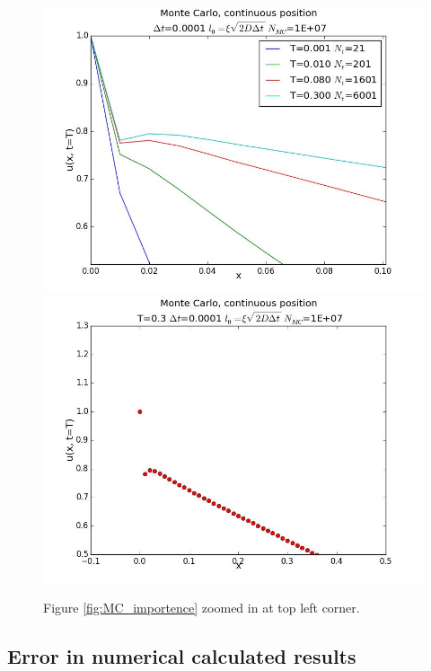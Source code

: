 \documentclass[12pt]{article}
\begin{document}
\begin{flushleft}
\begin{figure}[!h]
  \begin{minipage}{\linewidth}
    \centering
    {\includegraphics[scale=0.27]{MC_importance_zoom}}
     {\includegraphics[scale=0.27]{hist}}
    \caption{Figure \ref{fig:MC_importence} zoomed in at top left corner.}
  \end{minipage}
\end{figure}


\newpage
\subsection{Error in numerical calculated results}

\end{flushleft}
\end{document}
